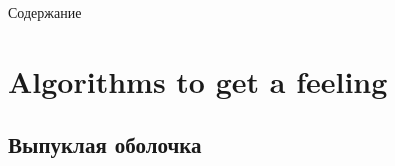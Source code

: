 \documentclass[12pt,aspectratio=169,svgnames]{beamer}
\begin{document}
 \maketitle

    \begin{frame}{Содержание}

        \tableofcontents

    \end{frame}

    \section{Algorithms to get a feeling}

    \subsection{Выпуклая оболочка}
\end{document}
